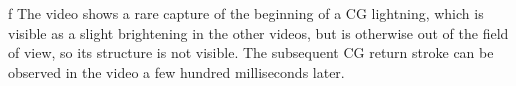 \midinsert
{}
\caption/f   The video shows a rare capture of the beginning of a CG lightning, which is visible as a slight brightening in the other videos, but is otherwise out of the field of view, so its structure is not visible. The subsequent CG return stroke can be observed in the video a few hundred milliseconds later.
\endinsert


\bye

